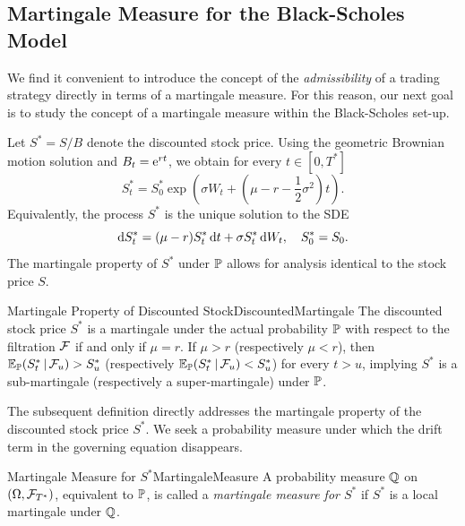 \subsection{Martingale Measure for the Black-Scholes Model}
We find it convenient to introduce the concept of the \textit{admissibility} of a trading strategy directly in terms of a martingale measure. For this reason, our next goal is to study the concept of a martingale measure within the Black-Scholes set-up.

Let \(S^* = S/B\) denote the discounted stock price. Using the geometric Brownian motion solution  and \(B_t = \mathrm{e}^{rt}\), we obtain for every \(t \in [0, T^*]\)
\begin{equation}
	S^*_t = S^*_0 \exp\left(\sigma W_t + \left(\mu - r - \frac{1}{2}\sigma^2\right) t\right).
	\label{eq:DiscountedGBMSolution}
\end{equation}
Equivalently, the process \(S^*\) is the unique solution to the SDE
\begin{equation}
	\mathrm{d} S^*_t = (\mu - r) S^*_t \, \mathrm{d} t + \sigma S^*_t \, \mathrm{d} W_t, \quad S^*_0 = S_0.
	\label{eq:DiscountedSDE}
\end{equation}
The martingale property of \(S^*\) under \(\mathbb{P}\) allows for analysis identical to the stock price \(S\).
\begin{cor}{Martingale Property of Discounted Stock}{DiscountedMartingale}
	The discounted stock price \(S^*\) is a martingale under the actual probability \(\mathbb{P}\) with respect to the filtration \(\mathcal{F}\) if and only if \(\mu = r\). If \(\mu > r\) (respectively \(\mu < r\)), then \(\mathbb{E}_{\mathbb{P}}(S^*_t \,\vert\, \mathcal{F}_u) > S^*_u\) (respectively \(\mathbb{E}_{\mathbb{P}}(S^*_t \,\vert\, \mathcal{F}_u) < S^*_u\)) for every \(t > u\), implying \(S^*\) is a sub-martingale (respectively a super-martingale) under \(\mathbb{P}\).
\end{cor}

The subsequent definition directly addresses the martingale property of the discounted stock price \(S^*\). We seek a probability measure under which the drift term in the governing equation  disappears.

\begin{defn}{Martingale Measure for \(S^*\)}{MartingaleMeasure}
	A probability measure \(\mathbb{Q}\) on \((\Omega, \mathcal{F}_{T^*})\), equivalent to \(\mathbb{P}\), is called a \textit{martingale measure for \(S^*\)} if \(S^*\) is a local martingale under \(\mathbb{Q}\).
\end{defn}

